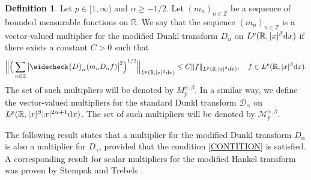 \documentclass[11pt,oneside]{amsart}
\numberwithin{equation}{section}
\theoremstyle{definition}
\newtheorem{definition}[equation]{Definition}
\newcommand{\RR}{\mathbb{R}}
\newcommand{\ZZ}{\mathbb{Z}}
\begin{document}
\begin{definition}
Let $p \in [1,\infty)$ and $\alpha \geq -1/2$. Let $(m_n)_{n\in\mathbb{Z}}$ be a sequence of bounded measurable functions on $\mathbb{R}$. We say that the sequence $(m_n)_{n\in\mathbb{Z}}$ is a vector-valued multiplier for the modified Dunkl transform $D_\alpha$ on $L^p(\RR,|x|^\beta{\rm d}x)$ if there exists a constant $C > 0$ such that
\begin{equation*}
    \Big\|\Big(\sum_{n\in\ZZ}\big|\widecheck{D}_\alpha(m_n D_\alpha f)\big|^2\Big)^{1/2}\Big\|_{L^p(\RR,|x|^\beta{\rm d}x)}\leq C\|f\|_{L^p(\RR,|x|^\beta{\rm d}x)},\quad f \in {L^p(\RR,|x|^\beta{\rm d}x)}.
\end{equation*}
The set of such multipliers will be denoted by $M_p^{\alpha,\beta}$. In a similar way, we define the vector-valued multipliers for the standard Dunkl transform $\mathcal{D}_\alpha$ on $L^p(\RR,|x|^\beta|x|^{2\alpha+1}{\rm d}x)$. The set of such multipliers will be denoted by $\mathcal{M}_p^{\alpha,\beta}$.
\end{definition}
The following result states that a multiplier for the modified Dunkl transform $D_\alpha$ is also a multiplier for $D_\gamma$, provided that the condition \eqref{CONTITION} is satisfied. A corresponding result for scalar multipliers for the modified Hankel transform was proven by Stempak and Trebels \cite[Corollary 2.1]{StempakTrebels1997}.
\end{document}
